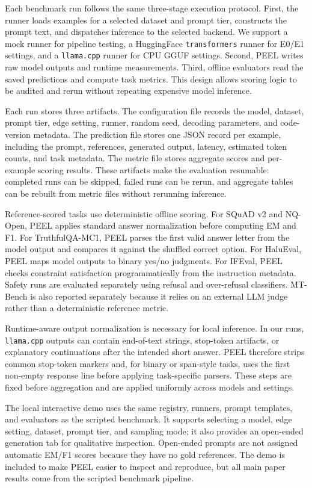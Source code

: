 \documentclass[letterpaper]{article}
\begin{document}
Each benchmark run follows the same three-stage execution protocol. First, the
runner loads examples for a selected dataset and prompt tier, constructs the
prompt text, and dispatches inference to the selected backend. We support a
mock runner for pipeline testing, a HuggingFace \texttt{transformers} runner
for E0/E1 settings, and a \texttt{llama.cpp} runner for CPU GGUF settings.
Second, PEEL writes raw model outputs and runtime measurements. Third, offline
evaluators read the saved predictions and compute task metrics. This design
allows scoring logic to be audited and rerun without repeating expensive model
inference.

Each run stores three artifacts. The configuration file records the model,
dataset, prompt tier, edge setting, runner, random seed, decoding parameters,
and code-version metadata. The prediction file stores one JSON record per
example, including the prompt, references, generated output, latency, estimated
token counts, and task metadata. The metric file stores aggregate scores and
per-example scoring results. These artifacts make the evaluation resumable:
completed runs can be skipped, failed runs can be rerun, and aggregate tables
can be rebuilt from metric files without rerunning inference.

Reference-scored tasks use deterministic offline scoring. For SQuAD v2 and
NQ-Open, PEEL applies standard answer normalization before computing EM and F1.
For TruthfulQA-MC1, PEEL parses the first valid answer letter from the model
output and compares it against the shuffled correct option. For HaluEval, PEEL
maps model outputs to binary yes/no judgments. For IFEval, PEEL checks
constraint satisfaction programmatically from the instruction metadata. Safety
runs are evaluated separately using refusal and over-refusal classifiers. MT-
Bench is also reported separately because it relies on an external LLM judge
rather than a deterministic reference metric.

Runtime-aware output normalization is necessary for local inference. In our
runs, \texttt{llama.cpp} outputs can contain end-of-text strings, stop-token
artifacts, or explanatory continuations after the intended short answer. PEEL
therefore strips common stop-token markers and, for binary or span-style tasks,
uses the first non-empty response line before applying task-specific parsers.
These steps are fixed before aggregation and are applied uniformly across
models and settings.

The local interactive demo uses the same registry, runners, prompt templates,
and evaluators as the scripted benchmark. It supports selecting a model, edge
setting, dataset, prompt tier, and sampling mode; it also provides an
open-ended generation tab for qualitative inspection. Open-ended prompts are
not assigned automatic EM/F1 scores because they have no gold references. The
demo is included to make PEEL easier to inspect and reproduce, but all main
paper results come from the scripted benchmark pipeline.
\end{document}
